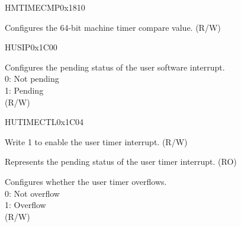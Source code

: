 \begin{register}{H}{MTIMECMP}{0x1810}\label{regdesc:CLINTMTIMECMPREG}
%
\regnewline%
%
\regnewline%
\begin{regdesc}
\begin{reglist}
\label{fielddesc:CLINTMTIMECMP}\item [MTIMECMP] Configures the 64-bit machine timer compare value. (R/W)
\end{reglist}
\end{regdesc}
\end{register}

\begin{register}{H}{USIP}{0x1C00}\label{regdesc:CLINTUSIPREG}
%
%
\regnewline%
\begin{regdesc}
\begin{reglist}
\label{fielddesc:CLINTUSIP}\item[USIP] Configures the pending status of the user software interrupt.\\
0: Not pending\\
1: Pending\\
(R/W)
\end{reglist}
\end{regdesc}
\end{register}

\begin{register}{H}{UTIMECTL}{0x1C04}\label{regdesc:CLINTUTIMECTLREG}
%
%
%
%
%
\regnewline%
\begin{regdesc}
\begin{reglist}
\label{fielddesc:CLINTUTIMECTLUTIE}\item [UTIE] Write 1 to enable the user timer interrupt. (R/W)
\label{fielddesc:CLINTUTIMECTLUTIP}\item [UTIP] Represents the pending status of the user timer interrupt. (RO)
\label{fielddesc:CLINTUTIMECTLUTOF}\item [UTOF] Configures whether the user timer overflows.\\
0: Not overflow\\
1: Overflow\\
(R/W)
\end{reglist}
\end{regdesc}
\end{register}

